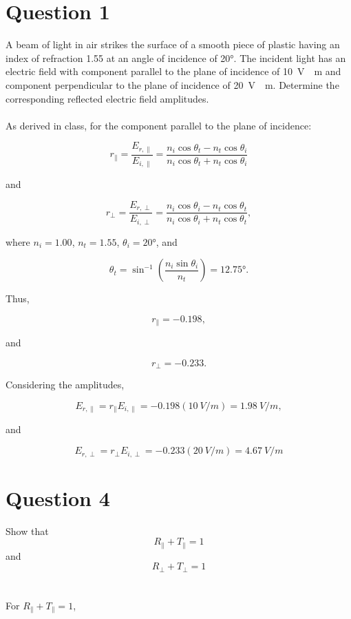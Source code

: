 \documentclass[a4paper]{article}
\begin{document}
\section*{Question 1}
A beam of light in air strikes the surface of a smooth piece of plastic having an index of refraction 1.55 at an angle of incidence of \ang{20}. The incident light has an electric field with component parallel to the plane of incidence of \qty{10}{V \per m} and component perpendicular to the plane of incidence of \qty{20}{V \per m}. Determine the corresponding reflected electric field amplitudes. \\\\

As derived in class, for the component parallel to the plane of incidence:

\[
    r_\parallel = \frac{E_{r, \parallel}}{E_{i, \parallel}} = \frac{n_i \cos \theta_t - n_t \cos \theta_i}{n_i \cos \theta_t + n_t \cos \theta_i}
\]

and 

\[
    r_\perp = \frac{E_{r, \perp}}{E_{i, \perp}} = \frac{n_i \cos \theta_i - n_t \cos \theta_t}{n_i \cos \theta_i + n_t \cos \theta_t},
\]

where $n_i = 1.00$, $n_t = 1.55$, $\theta_i = \ang{20}$, and 

\[
    \theta_t = \sin^{-1}\left(\frac{n_i \sin \theta_i}{n_t}\right) = \ang{12.75}.
\]

Thus,

\[
    r_\parallel = -0.198,
\]

and

\[
    r_\perp = -0.233.
\]

Considering the amplitudes,

\[
    E_{r, \parallel} = r_\parallel E_{i, \parallel} = -0.198 (\qty{10}{V \per m}) = \qty{1.98}{V \per m},
\]

and

\[
    E_{r, \perp} = r_\perp E_{i, \perp} = -0.233 (\qty{20}{V \per m}) = \qty{4.67}{V \per m}
\]
\newpage
\section*{Question 4}
Show that
\[
    R_\parallel  + T_\parallel = 1
\]
and
\[
    R_\perp  + T_\perp = 1
\]\\\\

For $R_\parallel  + T_\parallel = 1$,
\end{document}
